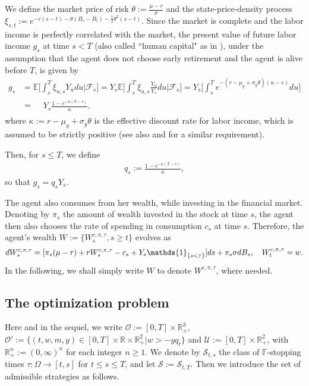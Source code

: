\documentclass[a4paper,11pt]{amsart}
\numberwithin{equation}{section}
\newcommand{\blue}[1]{{\color{black}#1}}
\begin{document}
We define the market price of risk $\theta:= \frac{\mu-r}{\sigma}$ and the state-price-density process $\xi_{s,t}:=e^{-r(s-t)-\theta (B_s-B_t) -\frac{1}{2}\theta^2 (s-t)}$. Since the market is complete and the labor income is perfectly correlated with the market, {the present value of future labor income $g_s$ at time $s<T$ (also called ``human capital" as in \citet{dybvig2010lifetime}), under the assumption that the agent does not choose early retirement and the agent is alive before $T$,} is given by
\begin{align}\label{b(s)}
g_s&= \mathbb{E} \bigg[\int^{T}_s \xi_{u,s} Y_u du\bigg| \mathcal{F}_s \bigg] =Y_s \mathbb{E} \bigg[\int^{T}_s \xi_{u,s} \frac{Y_u}{Y_s} du\bigg| \mathcal{F}_s\bigg]=Y_s  \bigg[\int^{T}_s e^{-(r-\mu_y+\sigma_y \theta)(u-s)}  du\bigg] \nonumber\\
&=
\begin{aligned}
&Y_s \frac{1-e^{-\kappa(T-s)}}{\kappa},
\end{aligned}
\end{align} 
where $\kappa:=r-\mu_y+\sigma_y\theta$ is the effective discount rate for labor income, which is assumed to be strictly positive (see also \citet{dybvig2011verification} and \citet{guan2025retirement} for a similar requirement). 

 Then, for $s\leq T$, we define 
\begin{align*}
q_s:=\frac{1-e^{-\kappa(T-s)}}{\kappa},
\end{align*}
so that $g_s=q_sY_s$.


The agent also consumes from her wealth, while investing in the financial market. Denoting by $\pi_s$ the amount of wealth invested in the stock at time $s$, the agent then also chooses the rate of spending in consumption $c_s$ at time $s$. Therefore, the agent's wealth $W:=\{W^{c,\pi,\tau}_s, s\geq t\}$ evolves as 
\begin{align}\label{sde}
d W^{c,\pi, \tau}_s =  [\pi_s(\mu-r)+rW^{c,\pi,\tau}_s-c_s + Y_s \blue{\mathds{1}_{\{s<\tau\}}}]ds +\pi_s \sigma dB_s, \quad W_t^{c,\pi,\tau}= w.
\end{align}
In the following, we shall simply write $W$ to denote $W^{c,\pi, \tau}$, where needed.



\subsection{The optimization problem}
 Here and in the sequel, we write \blue{$\mathcal{O}:=[0,T] \times \mathbb{R}^3_+$}, \blue{$\mathcal{O}':= \{(t,w,m,y)\in [0,T] \times \mathbb{R} \times \mathbb{R}^2_+| w>-y q_t \}$ } and $\mathcal{U}:=[0,T] \times \mathbb{R}^2_+$, with $\mathbb{R}^n_+:=(0,\infty)^n$ for each integer $n\geq 1$. We denote by $\mathcal{S}_{t,s}$ the class of $\mathbb{F}$-stopping times $\tau: \Omega \to [t,s]$ for $t \leq s \leq T$, and let $\mathcal{S} := \mathcal{S}_{t,T}$. Then we introduce the set of admissible strategies as follows.
\end{document}
